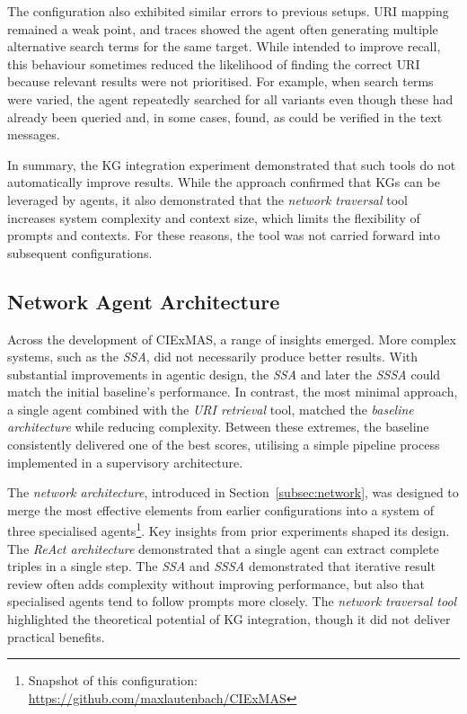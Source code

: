 \documentclass[a4paper,oneside,bibliography=totoc]{scrbook}
\begin{document}
The configuration also exhibited similar errors to previous setups. \ac{URI} mapping remained a weak point, and traces showed the agent often generating multiple alternative search terms for the same target. While intended to improve recall, this behaviour sometimes reduced the likelihood of finding the correct \ac{URI} because relevant results were not prioritised. For example, when search terms were varied, the agent repeatedly searched for all variants even though these had already been queried and, in some cases, found, as could be verified in the text messages.

In summary, the \ac{KG} integration experiment demonstrated that such tools do not automatically improve results. While the approach confirmed that \acp{KG} can be leveraged by agents, it also demonstrated that the \textit{network traversal} tool increases system complexity and context size, which limits the flexibility of prompts and contexts. For these reasons, the tool was not carried forward into subsequent configurations.

\subsection{Network Agent Architecture}
\label{subsec:full_network_agent_architecture}

Across the development of CIExMAS, a range of insights emerged. More complex systems, such as the \textit{\ac{SSA}}, did not necessarily produce better results. With substantial improvements in agentic design, the \textit{\ac{SSA}} and later the \textit{\ac{SSSA}} could match the initial baseline's performance. In contrast, the most minimal approach, a single agent combined with the \textit{\ac{URI} retrieval} tool, matched the \textit{baseline architecture} while reducing complexity. Between these extremes, the baseline consistently delivered one of the best scores, utilising a simple pipeline process implemented in a supervisory architecture.

The \textit{network architecture}, introduced in Section~\ref{subsec:network}, was designed to merge the most effective elements from earlier configurations into a system of three specialised agents\footnote{Snapshot of this configuration: \url{https://github.com/maxlautenbach/CIExMAS}}. Key insights from prior experiments shaped its design. The \textit{\ac{ReAct} architecture} demonstrated that a single agent can extract complete triples in a single step. The \textit{\ac{SSA}} and \textit{\ac{SSSA}} demonstrated that iterative result review often adds complexity without improving performance, but also that specialised agents tend to follow prompts more closely. The \textit{network traversal tool} highlighted the theoretical potential of \ac{KG} integration, though it did not deliver practical benefits.
\end{document}
